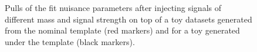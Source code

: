 \begin{figure}[h!]
\caption{Pulls of the fit nuisance parameters after injecting signals of different mass and signal strength on top of a toy datasets generated from the nominal  template (red markers) and for a toy generated under the \HERWIG{++} template (black markers). }
\label{fig:pullsTheta}
\end{figure}
\clearpage

